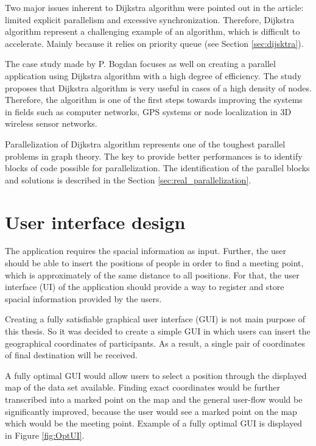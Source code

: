 \documentclass[thesis=M,english]{FITthesis}[2012/10/20]
\begin{document}
Two major issues inherent to Dijkstra algorithm were pointed out in the article: limited explicit parallelism and excessive synchronization. Therefore, Dijkstra algorithm represent a challenging example of an algorithm, which is difficult to accelerate. Mainly because it relies on priority queue (see Section \ref{sec:dijsktra}).

The case study made by P. Bogdan \cite{Bogdan15} focuses as well on creating a parallel application using Dijkstra algorithm with a high degree of efficiency. The study proposes that Dijkstra algorithm is very useful in cases of a high density of nodes. Therefore, the algorithm is one of the first steps towards improving the systems in fields such as computer networks, GPS systems or node localization in 3D wireless sensor networks.

Parallelization of Dijkstra algorithm represents one of the toughest parallel problems in graph theory. The key to provide better performances is to identify blocks of code possible for parallelization. The identification of the parallel blocks and solutions is described in the Section \ref{sec:real_parallelization}.

\section{User interface design}
\label{sec:UIDesign}
The application requires the spacial information as input. 
Further, the user should be able to insert the positions of people in order to find a meeting point, which is approximately of the same distance to all positions. For that, the user interface (UI) of the application should provide a way to register and store spacial information provided by the users. 

Creating a fully satisfiable graphical user interface (GUI) is not main purpose of this thesis. So it was decided to create a simple GUI in which users can insert the geographical coordinates of participants. As a result, a single pair of coordinates of final destination will be received. 

A fully optimal GUI would allow users to select a position through the displayed map of the data set available. Finding exact coordinates would be further transcribed into a marked point on the map and the general user-flow would be significantly improved, because the user would see a marked point on the map which would be the meeting point. Example of a fully optimal GUI is displayed in Figure \ref{fig:OptUI}.
\end{document}
